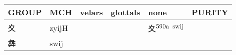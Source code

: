 \documentclass[14pt,a4paper]{scrartcl}
\begin{document}
\begin{longtable}[c]{@{}llllll@{}}
\toprule
\begin{minipage}[b]{0.14\columnwidth}\raggedright\strut
GROUP
\strut\end{minipage} &
\begin{minipage}[b]{0.14\columnwidth}\raggedright\strut
MCH
\strut\end{minipage} &
\begin{minipage}[b]{0.14\columnwidth}\raggedright\strut
velars
\strut\end{minipage} &
\begin{minipage}[b]{0.14\columnwidth}\raggedright\strut
glottals
\strut\end{minipage} &
\begin{minipage}[b]{0.14\columnwidth}\raggedright\strut
none
\strut\end{minipage} &
\begin{minipage}[b]{0.14\columnwidth}\raggedright\strut
PURITY
\strut\end{minipage}\tabularnewline
\midrule
\endhead
\begin{minipage}[t]{0.14\columnwidth}\raggedright\strut
夊
\strut\end{minipage} &
\begin{minipage}[t]{0.14\columnwidth}\raggedright\strut
zyijH
\strut\end{minipage} &
\begin{minipage}[t]{0.14\columnwidth}\raggedright\strut
\strut\end{minipage} &
\begin{minipage}[t]{0.14\columnwidth}\raggedright\strut
\strut\end{minipage} &
\begin{minipage}[t]{0.14\columnwidth}\raggedright\strut
夊\textsuperscript{590a~swij}
\strut\end{minipage} &
\begin{minipage}[t]{0.14\columnwidth}\raggedright\strut
\strut\end{minipage}\tabularnewline
\begin{minipage}[t]{0.14\columnwidth}\raggedright\strut
彝
\strut\end{minipage} &
\begin{minipage}[t]{0.14\columnwidth}\raggedright\strut
swij
\strut\end{minipage} &
\begin{minipage}[t]{0.14\columnwidth}\raggedright\strut
\strut\end{minipage} &
\begin{minipage}[t]{0.14\columnwidth}\raggedright\strut

\end{minipage}
\end{longtable}
\end{document}
